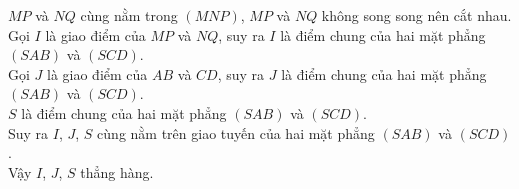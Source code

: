 \begin{bt}
{\begin{listEX}
		\item[c)]
	$MP$ và $NQ$ cùng nằm trong $\left(MNP\right)$, $MP$ và $NQ$ không song song nên cắt nhau.\\
	Gọi $I$ là giao điểm của $MP$ và $NQ$, suy ra $I$ là điểm chung của hai mặt phẳng $\left(SAB\right)$ và $\left(SCD\right)$.\\
	Gọi $J$ là giao điểm của $AB$ và $CD$, suy ra $J$ là điểm chung của hai mặt phẳng $\left(SAB\right)$ và $\left(SCD\right)$.\\
	$S$ là điểm chung của hai mặt phẳng $\left(SAB\right)$ và $\left(SCD\right)$.\\
	Suy ra $I$, $J$, $S$ cùng nằm trên giao tuyến của hai mặt phẳng $\left(SAB\right)$ và $\left(SCD\right)$.\\
	Vậy $I$, $J$, $S$ thẳng hàng.
\end{listEX}

}
\end{bt}

